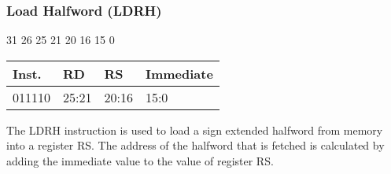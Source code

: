 \documentclass[12pt]{article}
\begin{document}

    \newpage
    \subsubsection{Load Halfword (LDRH)}
    
    \hspace{1.6cm}31 \hspace{1.15cm}26 \hspace{.05cm}25 \hspace{.8cm}21 \hspace{.05cm}20 \hspace{.8cm}16 \hspace{.05cm}15 \hspace{6.4cm}0
    \vspace{-.25cm}
    \begin{center}
        \begin{tabular}{ |p{1.8cm}|p{1.5cm}|p{1.5cm}|p{6.8cm}| }
            \hline
            \textbf{Inst.} & \textbf{RD} &  \textbf{RS} & \textbf{Immediate}\\
            \hline
            011110& 25:21 & 20:16 &15:0\\
            \hline
        \end{tabular}
    \end{center}
    
    \noindent
    The LDRH instruction is used to load a sign extended halfword from memory into a register RS. The address of the halfword that is fetched is calculated by adding the immediate value to the value of register RS. 
    
\end{document}

